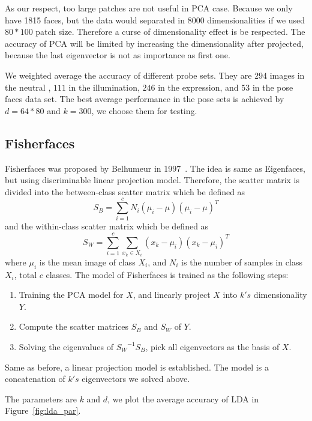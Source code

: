 \documentclass[10pt,twocolumn,letterpaper]{article}
\begin{document}
As our respect, too large patches are not useful in PCA case. Because we only have 1815
faces, but the data would separated in 8000 dimensionalities if we used $80*100$ patch size.
Therefore a curse of dimensionality effect is be respected. The accuracy of PCA will 
be limited by increasing the dimensionality after projected, because the last eigenvector
is not as importance as first one. 

We weighted average the accuracy of different probe sets. They are $294$ images in the neutral
, $111$ in the illumination, $246$ in the expression, and $53$ in the pose faces data set.
The best average performance in the pose sets is achieved by $d=64*80$ and $k=300$, we choose them for testing.


\subsection{Fisherfaces}
Fisherfaces was proposed by Belhumeur \etal in 1997~\cite{Belhumeur1997}. 
The idea is same as Eigenfaces, but using discriminable linear projection model. 
Therefore, the scatter matrix is divided into the between-class scatter matrix
which be defined as
\[
    S_B=\sum^c_{i=1}N_i(\mu_i-\mu)(\mu_i-\mu)^T
\]
and the within-class scatter matrix which be defined as
\[
    S_W=\sum^c_{i=1}\sum_{x_k\in X_i}(x_k-\mu_i)(x_k-\mu_i)^T
\]
where $\mu_i$ is the mean image of class $X_i$, and $N_i$ is the number of samples
in class $X_i$, total $c$ classes. The model of Fisherfaces is trained as the following steps:
\begin{center}
    \begin{enumerate}
        \item Training the PCA model for $X$, and linearly project $X$ into $k's$ dimensionality $Y$.
        \item Compute the scatter matrices $S_B$ and $S_W$ of $Y$.
        \item Solving the eigenvalues of ${S_W}^{-1}S_B$, pick all eigenvectors as the basis of $X$.
    \end{enumerate}
\end{center}
Same as before, a linear projection model is established. The model is a concatenation of
$k's$ eigenvectors we solved above.

The parameters are $k$ and $d$, we plot the average accuracy of LDA in Figure~\ref{fig:lda_par}.
\end{document}
